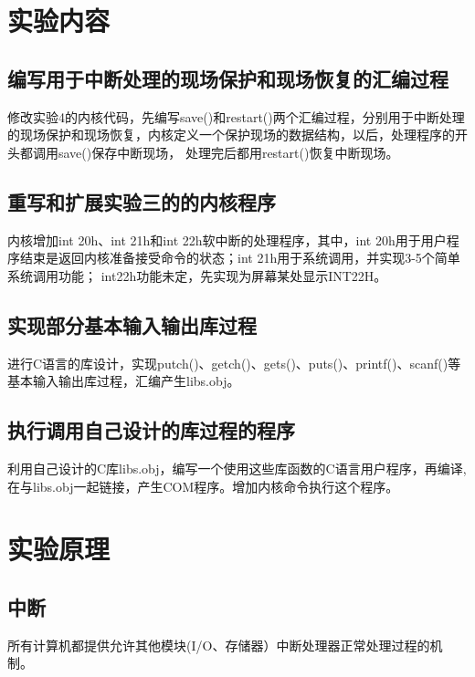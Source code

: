 \documentclass[a4paper, 11pt]{article} %
\begin{document}
\section{实验内容}

\subsection{编写用于中断处理的现场保护和现场恢复的汇编过程}

修改实验4的内核代码，先编写save()和restart()两个汇编过程，分别用于中断处理的现场保护和现场恢复，内核定义一个保护现场的数据结构，以后，处理程序的开头都调用save()保存中断现场，
处理完后都用restart()恢复中断现场。

\subsection{重写和扩展实验三的的内核程序}

内核增加int 20h、int 21h和int 22h软中断的处理程序，其中，int 20h用于用户程序结束是返回内核准备接受命令的状态；int 21h用于系统调用，并实现3-5个简单系统调用功能；
int22h功能未定，先实现为屏幕某处显示INT22H。

\subsection{实现部分基本输入输出库过程}

进行C语言的库设计，实现putch()、getch()、gets()、puts()、printf()、scanf()等基本输入输出库过程，汇编产生libs.obj。

\subsection{执行调用自己设计的库过程的程序}

利用自己设计的C库libs.obj，编写一个使用这些库函数的C语言用户程序，再编译,在与libs.obj一起链接，产生COM程序。增加内核命令执行这个程序。


\section{实验原理}
\subsection{中断}
所有计算机都提供允许其他模块(I/O、存储器）中断处理器正常处理过程的机制。
\end{document}
